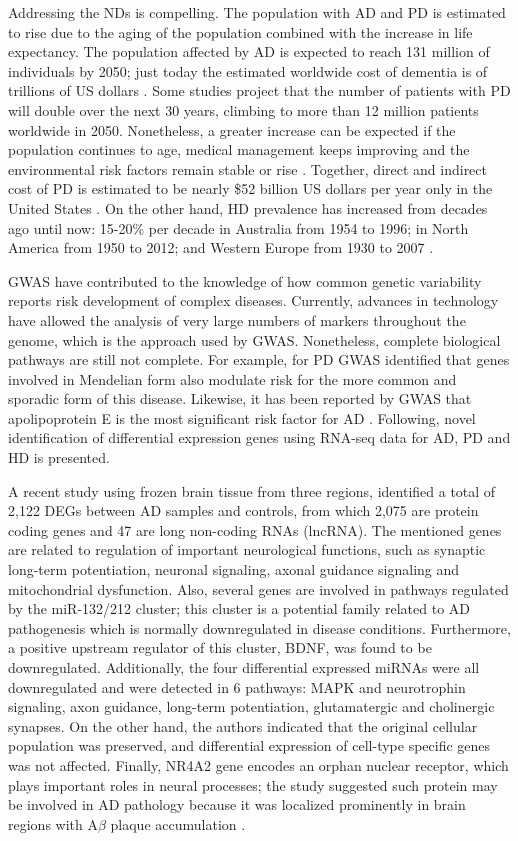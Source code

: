 Addressing the NDs is compelling. The population with AD and PD is estimated to rise due to the aging of the population combined with the increase in life expectancy. The population affected by AD is expected to reach 131 million of individuals by 2050; just today the estimated worldwide cost of dementia is of trillions of US dollars \cite{WAR}. Some studies project that the number of patients with PD will double over the next 30 years, climbing to more than 12 million patients worldwide in 2050. Nonetheless, a greater increase can be expected if the population continues to age, medical management keeps improving and the environmental risk factors remain stable or rise \cite{Rocca}. Together, direct and indirect cost of PD is estimated to be nearly \$52 billion US dollars per year only in the United States \cite{Marras}. On the other hand, HD prevalence has increased from decades ago until now: 15-20\% per decade in Australia from 1954 to 1996; in North America from 1950 to 2012; and Western Europe from 1930 to 2007 \cite{Rawlins}.

GWAS have contributed to the knowledge of how common genetic variability reports risk development of complex diseases. Currently, advances in technology have allowed the analysis of very large numbers of markers throughout the genome, which is the approach used by GWAS. Nonetheless, complete biological pathways are still not complete. For example, for PD GWAS identified that genes involved in Mendelian form also modulate risk for the more common and sporadic form of this disease. Likewise, it has been reported by GWAS that apolipoprotein E is the most significant risk factor for AD \cite{Bras}. Following, novel identification of differential expression genes using RNA-seq data for AD, PD and HD is presented.

A recent study using frozen brain tissue from three regions, identified a total of 2,122 DEGs between AD samples and controls, from which 2,075 are protein coding genes and 47 are long non-coding RNAs (lncRNA). The mentioned genes are related to regulation of important neurological functions, such as synaptic long-term potentiation, neuronal signaling, axonal guidance signaling and mitochondrial dysfunction. Also, several genes are involved in pathways regulated by the miR-132/212 cluster; this cluster is a potential family related to AD pathogenesis which is normally downregulated in disease conditions. Furthermore, a positive upstream regulator of this cluster, BDNF, was found to be downregulated. Additionally, the four differential expressed miRNAs were all downregulated and were detected in 6 pathways: MAPK and neurotrophin signaling, axon guidance, long-term potentiation, glutamatergic and cholinergic synapses. On the other hand, the authors indicated that the original cellular population was preserved, and differential expression of cell-type specific genes was not affected. Finally, NR4A2 gene encodes an orphan nuclear receptor, which plays important roles in neural processes; the study suggested such protein may be involved in AD pathology because it was localized prominently in brain regions with A$\beta$ plaque accumulation \cite{Annese}.

